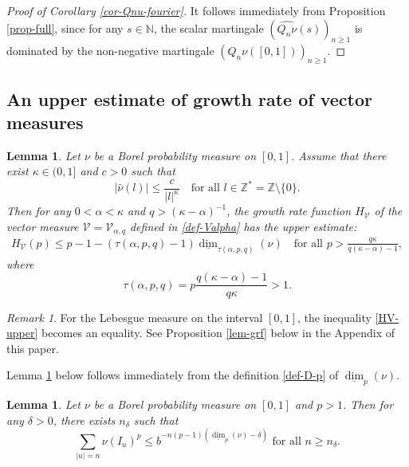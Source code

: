 \documentclass[12pt]{amsart}
\newtheorem{lemma}[theorem]{Lemma}
\theoremstyle{definition}
\theoremstyle{remark}
\newtheorem*{remark*}{Remark}
\newcommand{\N}{\mathbb{N}}
\newcommand{\Z}{\mathbb{Z}}
\newcommand{\ldim}{\underline{\dim}}
\numberwithin{equation}{section}
\begin{document}
 \begin{proof}[Proof of Corollary \ref{cor-Qnu-fourier}]
 It follows immediately from Proposition \ref{prop-full}, since for any $s\in\N$, the scalar martingale $(\widehat{Q_n\nu}(s))_{n\ge 1}$ is dominated by the non-negative martingale $
(Q_n\nu([0,1]))_{n\ge 1}$.
 \end{proof}
 

\subsection{An upper estimate of growth rate of vector measures}\label{sec-grv}



\begin{lemma}\label{lem-gen-measure}
Let $\nu$ be a  Borel probability measure on $[0,1]$.  Assume that there exist $\kappa\in (0,1]$ and $c>0$ such that 
\[
|\widehat{\nu}(l)|\le  \frac{c}{|l|^{\kappa}} \quad \text{for all $l\in \Z^* = \Z\setminus \{0\}$}.
\]
Then for any $0< \alpha < \kappa$ and  $q>(\kappa- \alpha)^{-1}$, the growth rate function $H_{\mathcal{V}}$ of the vector measure $\mathcal{V} = \mathcal{V}_{\alpha, q}$ defined in \eqref{def-Valpha} has the upper estimate: 
\begin{align}\label{HV-upper}
H_{\mathcal{V}}(p) \le         p-1 -  (\tau(\alpha, p, q) - 1) \ldim_{\tau(\alpha, p, q)}(\nu)  \quad \text{for all $p> \frac{q\kappa}{q(\kappa - \alpha) -1}$},
\end{align}
where
\[
\tau(\alpha,p, q) = p \frac{q(\kappa-\alpha) - 1}{q \kappa}>1.
\]
\end{lemma}

\begin{remark*}
For  the Lebesgue measure on the interval $[0,1]$,  the inequality \eqref{HV-upper} becomes an equality. See  Proposition \ref{lem-grf} below in the Appendix of this paper. 
\end{remark*}





 Lemma \ref{lem-lq-dim} below follows immediately  from the definition  \eqref{def-D-p} of $\ldim_p(\nu)$. 
\begin{lemma}\label{lem-lq-dim}
Let $\nu$ be a  Borel probability measure on $[0,1]$ and $p>1$. Then for any $\delta> 0$,   there exists $n_\delta$ such that 
\[
\sum_{|u|=n}  \nu(I_u)^p \le   b^{-n (p-1) (\ldim_p(\nu) - \delta)}  \,\,  \text{for all $n\ge n_\delta$.}
\]
\end{lemma}
\end{document}
